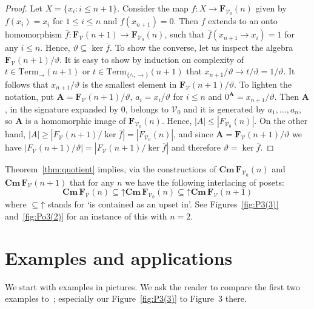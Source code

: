 \documentclass{amsart}
\newcommand{\alg}[1]{\mathbf{#1}}
\newcommand{\ov}[1]{\overline{#1}}
\newcommand{\FV}{\alg{F}_\mathcal{V}}
\newcommand{\FVo}{\alg{F}_{\mathcal{V}_0}}
\newcommand{\Cm}[1]{\mathbf{Cm}\, #1}
\def\ra{\rightarrow}
\def\up#1{{#1}\mathord{\uparrow}}
\begin{document}
\begin{proof}
Let $X = \{x_i: i\leq n+1\}$. Consider the map $f\colon X\to \FVo(n)$ given
by $f(x_i) = x_i$ for $1\leq i\leq n$ and $f(x_{n+1}) = 0$. Then
$f$ extends to an onto homomorphism $\ov{f}: \FV(n+1)\to \FVo(n)$, such
that $\ov{f}(x_{n+1}\ra x_i) =1$ for any $i\leq n$. Hence,
$\vartheta\subseteq \ker{\ov{f}}$. 
To show the converse, let us inspect the algebra $\FV(n+1)/\vartheta$.
It is easy to show by induction on complexity of
$t\in\mathrm{Term}_{\ra}(n+1)$ or $t\in\mathrm{Term}_{\{\wedge,\ra\}}(n+1)$
that $x_{n+1}/\vartheta\ra t/\vartheta = 1/\vartheta$. It follows that
$x_{n+1}/\vartheta$ is the smallest element in $\FV(n+1)/\vartheta$.
To lighten the notation, put $\alg{A} = \FV(n+1)/\vartheta$,
$a_i = x_i/\vartheta$ for $i\leq n$ and 
$0^\alg{A} = x_{n+1}/\vartheta$. Then $\alg{A}$, in the signature expanded by
$0$, belongs to $\mathcal{V}_0$ and it is generated by $a_1,\dots,a_n$, so
$\alg{A}$ is a homomorphic image of $\FVo(n)$. Hence,
$|A|\leq |\mathit{F}_{\mathcal{V}_0}(n)|$. On the other hand, 
$|A|\geq |\mathit{F}_{\mathcal{V}}(n+1)/\ker{\ov{f}}| =
|\mathit{F}_{\mathcal{V}_0}(n)|$, and since 
$\alg{A} = \FV(n+1)/\vartheta$ we have
$|\mathit{F}_{\mathcal{V}}(n+1)/\vartheta| =
|\mathit{F}_{\mathcal{V}}(n+1)/\ker{\ov{f}}|$ and therefore
$\vartheta = \ker{\ov{f}}$.     
\end{proof}  

Theorem~\ref{thm:quotient} implies, via the constructions of
$\Cm{\FVo(n)}$ and $\Cm{\FV(n+1)}$ that
for any $n$ we have the following interlacing of posets:
$$
\Cm{\FV(n)}\mathbin{\up{\subseteq}} \Cm{\FVo(n)}
\mathbin{\up{\subseteq}} \Cm{\FV(n+1)}
$$
where $\mathbin{\up{\subseteq}}$ stands for `is contained as an upset in'. 
See Figures~\ref{fig:P3(3)} and~\ref{fig:Po3(2)} for an instance of this
with $n = 2$.


\section{Examples and applications}\label{sec:ex-appl}

We start with examples in pictures. We ask the reader to
compare the first two examples to~\cite{Koh81}; especially our Figure~\ref{fig:P3(3)}
to Figure~3 there. 
\end{document}
